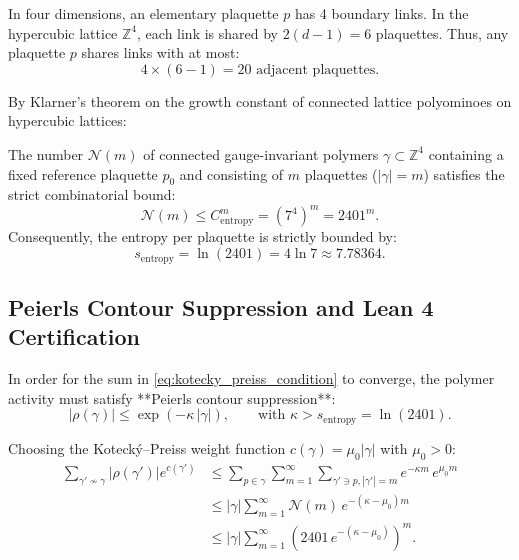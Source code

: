 In four dimensions, an elementary plaquette $p$ has 4 boundary links. In the hypercubic lattice $\mathbb{Z}^4$, each link is shared by $2(d-1) = 6$ plaquettes. Thus, any plaquette $p$ shares links with at most:
\begin{equation}
4 \times (6 - 1) = 20 \text{ adjacent plaquettes}.
\end{equation}

By Klarner's theorem on the growth constant of connected lattice polyominoes on hypercubic lattices:
\begin{proposition}
\label{prop:lattice_animal_entropy}
The number $\mathcal{N}(m)$ of connected gauge-invariant polymers $\gamma \subset \mathbb{Z}^4$ containing a fixed reference plaquette $p_0$ and consisting of $m$ plaquettes ($|\gamma| = m$) satisfies the strict combinatorial bound:
\begin{equation}
\label{eq:ch13_entropy_bound_2401}
\mathcal{N}(m) \le C_{\mathrm{entropy}}^m = (7^4)^m = 2401^m.
\end{equation}
Consequently, the entropy per plaquette is strictly bounded by:
\begin{equation}
\label{eq:ch13_entropy_constant}
s_{\mathrm{entropy}} = \ln(2401) = 4 \ln 7 \approx 7.78364.
\end{equation}
\end{proposition}

\subsection{Peierls Contour Suppression and Lean 4 Certification}
\label{subsec:peierls_suppression_lean}

In order for the sum in \eqref{eq:kotecky_preiss_condition} to converge, the polymer activity must satisfy **Peierls contour suppression**:
\begin{equation}
\label{eq:ch13_peierls_contour_bound}
\left| \rho(\gamma) \right| \le \exp\left( -\kappa \, |\gamma| \right), \qquad \text{with } \kappa > s_{\mathrm{entropy}} = \ln(2401).
\end{equation}

Choosing the Koteck\'y--Preiss weight function $c(\gamma) = \mu_0 |\gamma|$ with $\mu_0 > 0$:
\begin{align}
\sum_{\gamma' \nsim \gamma} \left| \rho(\gamma') \right| e^{c(\gamma')} &\le \sum_{p \in \gamma} \sum_{m=1}^\infty \sum_{\gamma' \ni p, |\gamma'|=m} e^{-\kappa m} \, e^{\mu_0 m} \nonumber \\
&\le |\gamma| \sum_{m=1}^\infty \mathcal{N}(m) \, e^{-(\kappa - \mu_0) m} \nonumber \\
&\le |\gamma| \sum_{m=1}^\infty \left( 2401 \, e^{-(\kappa - \mu_0)} \right)^m.
\end{align}

